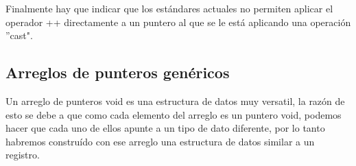 \documentclass[12pt ]{article}
\begin{document}
Finalmente hay que indicar que los estándares actuales no permiten aplicar el operador ++ directamente a un puntero al que se le está aplicando una operación ''cast".
\subsection{Arreglos de punteros genéricos}
Un arreglo de punteros void es una estructura de datos muy versatil, la razón de esto se debe a que como cada elemento del arreglo es un puntero void, podemos hacer que cada uno de ellos apunte a un tipo de dato diferente, por lo tanto habremos construído con ese arreglo una estructura de datos similar a un registro. 
\end{document}
